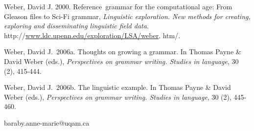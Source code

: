 \documentclass[letterpaper]{article}
\newcommand\textstyleInternetlink[1]{#1}
\begin{document}
Weber, David J. 2000. Reference~grammar for the computational age: From Gleason files to Sci-Fi grammar, \textit{Linguistic exploration. New methods for creating, exploring and }\textit{disseminating linguistic field data}. http://\href{http://www.ldc.upenn.edu/exploration/LSA/weber}{\textstyleInternetlink{www.ldc.upenn.edu/exploration/LSA/weber}}. htm/.

Weber, David J.~2006a. Thoughts on growing a grammar. In Thomas Payne \& David Weber (eds.), \textit{Perspectives on grammar writing. Studies in language}, 30 (2), 415-444.

Weber, David J.~2006b. The linguistic example. In Thomas Payne \& David Weber (eds.), \textit{Perspectives on grammar writing. Studies in language}, 30 (2), 445-460.

\clearpage
baraby.anne-marie@uqam.ca
\end{document}
